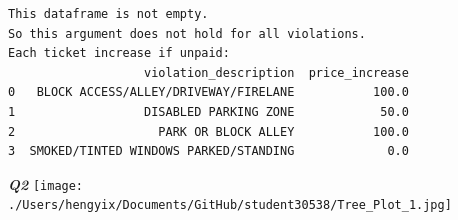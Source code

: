\documentclass[
  letterpaper,
  DIV=11,
  numbers=noendperiod]{scrartcl}
\begin{document}
\begin{verbatim}
This dataframe is not empty.
So this argument does not hold for all violations.
Each ticket increase if unpaid: 
                   violation_description  price_increase
0   BLOCK ACCESS/ALLEY/DRIVEWAY/FIRELANE           100.0
1                  DISABLED PARKING ZONE            50.0
2                    PARK OR BLOCK ALLEY           100.0
3  SMOKED/TINTED WINDOWS PARKED/STANDING             0.0
\end{verbatim}

\newpage

\textbf{\emph{Q2}}
\texttt{[image: ./Users/hengyix/Documents/GitHub/student30538/Tree\_Plot\_1.jpg]}
\end{document}
